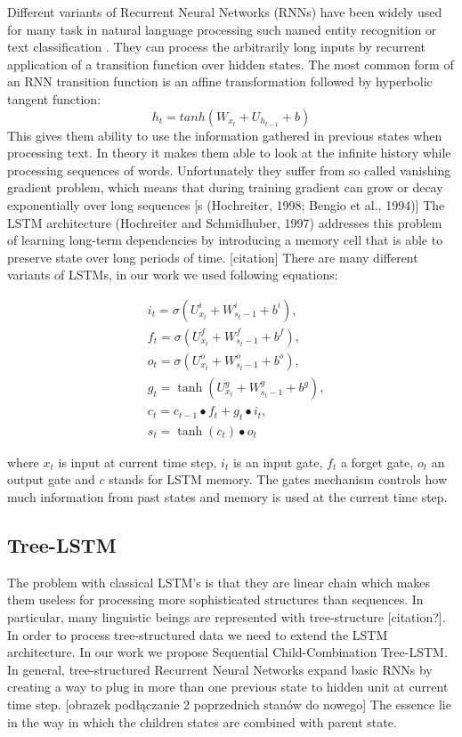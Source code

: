 \documentclass[10pt, a4paper]{article}
\begin{document}
Different variants of Recurrent Neural Networks (RNNs) have been widely used for many task in natural language processing such named entity recognition \cite{lample2016neural} or text classification \cite{lai2015recurrent}. They can process the arbitrarily long inputs by recurrent application of a transition function over hidden states. The most common form of an RNN transition function is an affine transformation followed by hyperbolic tangent function:
	\begin{equation} h_t = tanh(W_{x_t}+U_{h_{t-1}}+b)
\end{equation}
	This gives them ability to use the information gathered in previous states when processing text. In theory it makes them able to look at the infinite history while processing sequences of words. 	Unfortunately they suffer from so called vanishing gradient problem, which means that during training gradient can grow or decay exponentially over long sequences [s (Hochreiter,
1998; Bengio et al., 1994)]
	The LSTM architecture (Hochreiter and Schmidhuber, 1997) addresses this problem of learning long-term dependencies by introducing a memory cell that is able to preserve state over long periods of time. [citation]
		There are many different variants of LSTMs, in our work we used following equations:
		
\begin{equation}
\begin{split}
		&i_t = \sigma(U_{x_t}^i + W_{s_t-1}^i + b^i) ,\\
		&f_t = \sigma(U_{x_t}^f + W_{s_t-1}^f + b^f) ,\\
		&o_t = \sigma(U_{x_t}^o + W_{s_t-1}^o + b^o) ,\\
		&g_t = \tanh(U_{x_t}^g+ W_{s_t-1}^g + b^g) ,\\
		&c_t = c_{t-1} \bullet f_t + g_t \bullet i_t ,\\
		&s_t = \tanh(c_t) \bullet o_t 
\end{split}
\end{equation}

		where $x_t$ is input at current time step, $i_t$ is an input gate, $f_t$ a forget gate, $o_t$ an output gate and $c$ stands for LSTM memory.
		The gates mechanism controls how much information from past states and memory is used at the current time step. 

\subsection{Tree-LSTM}
	The problem with classical LSTM's is that they are linear chain which makes them useless for processing more sophisticated structures than sequences. In particular, many linguistic beings are represented with tree-structure [citation?].
	In order to process tree-structured data we need to extend the LSTM architecture. In our work we propose Sequential Child-Combination Tree-LSTM.
	In general, tree-structured Recurrent Neural Networks expand basic RNNs by creating a way to plug in more than one previous state to hidden unit at current time step.
	[obrazek podłączanie 2 poprzednich stanów do nowego]
	The essence lie in the way in which the children states are combined with parent state.
\end{document}
